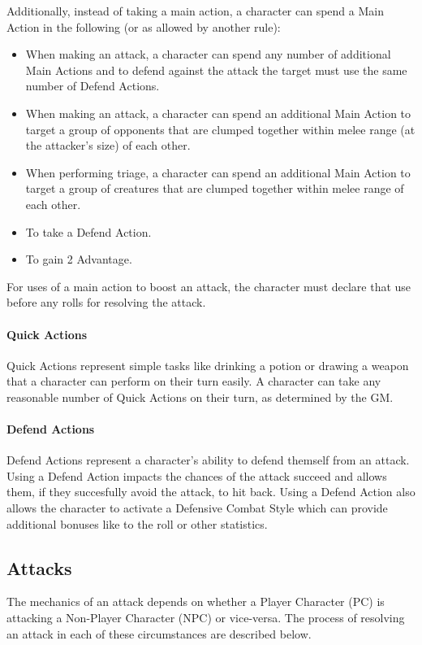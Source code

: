 Additionally, instead of taking a main action, a character can spend a Main Action in the following (or as allowed by another rule):
\begin{itemize}
  \item[-] When making an attack, a character can spend any number of additional Main Actions and to defend against the attack the target must use the same number of Defend Actions.
  \item[-] When making an attack, a character can spend an additional Main Action to target a group of opponents that are clumped together within melee range (at the attacker's size) of each other.
  \item[-] When performing triage, a character can spend an additional Main Action to target a group of creatures that are clumped together within melee range of each other.
  \item[-] To take a Defend Action.
  \item[-] To gain 2 Advantage.
\end{itemize}
For uses of a main action to boost an attack, the character must declare that use before any rolls for resolving the attack.

\paragraph{Quick Actions}
Quick Actions represent simple tasks like drinking a potion or drawing a weapon that a character can perform on their turn easily.
A character can take any reasonable number of Quick Actions on their turn, as determined by the GM.

\paragraph{Defend Actions}
Defend Actions represent a character's ability to defend themself from an attack.
Using a Defend Action impacts the chances of the attack succeed and allows them, if they succesfully avoid the attack, to hit back.
Using a Defend Action also allows the character to activate a Defensive Combat Style which can provide additional bonuses like to the roll or other statistics.

\subsection{Attacks}
The mechanics of an attack depends on whether a Player Character (PC) is attacking a Non-Player Character (NPC) or vice-versa\footnotemark.
The process of resolving an attack in each of these circumstances are described below.

